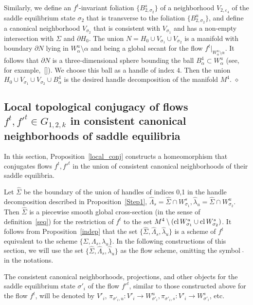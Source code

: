 \documentclass[%
 aip,
 amsmath,amssymb,
preprint,%
]{revtex4-1}
\newenvironment{proof}{{\bf Proof:}}
{\hfill $\diamond$\medskip}
\begin{document}
\begin{proof}
Similarly, we define an $f^t$-invariant foliation $\{B^s_{2,\sigma_2}\}$ of a neighborhood $V_{2,\varepsilon_4}$ of the saddle equilibrium state $\sigma_2$ that is transverse to the foliation $\{B^u_{2,\sigma_2}\}$, and define a canonical neighborhood $V_{\sigma_2}$ that is consistent with $V_{\sigma_1}$ and has a non-empty intersection with $\Sigma$ and $\partial H_0$. The union $N=H_0\cup V_{\sigma_1}\cup V_{\sigma_2}$ is a manifold with boundary $\partial N$ lying in $W^u_\alpha\setminus \alpha$ and being a global secant for the flow $f^t|_{W^u_{\alpha}\setminus \alpha}$. It follows that $\partial N$ is a three-dimensional sphere bounding the ball $B^4_\alpha\subset W^u_\alpha$ (see, for example,~[]). We choose this ball as a handle of index $4$. Then the union $H_0\cup V_{\sigma_1}\cup V_{\sigma_2}\cup B^4_\alpha$ is the desired handle decomposition of the manifold $M^4$.
\end{proof}

\subsection{Local topological conjugacy of flows $f^t, {f'}^t\in G_{1,2,k}$ in consistent canonical neighborhoods of saddle equilibria}

In this section, Proposition~\ref{local_conj} constructs a homeomorphism that conjugates flows $f^t, {f'}^t$ in the union of consistent canonical neighborhoods of their saddle equilibria.

Let $\widehat \Sigma$ be the boundary of the union of handles of indices 0,1 in the handle decomposition described in Proposition~\ref{Step1}, $\widehat \Lambda_s=\widehat \Sigma\cap W^s_{\sigma_1}, \widehat \lambda_u=\widehat \Sigma\cap W^u_{\sigma_2}$. Then $\widehat \Sigma$ is a piecewise smooth global cross-section (in the sense of definition~\ref{seq}) for the restriction of $f^t$ to the set $M^4\setminus ({\rm cl}\, W^u_{\sigma_1}\cup {\rm cl}\, W^s_{\sigma_2})$. It follows from Proposition~\ref{indep} that the set $\{\widehat \Sigma, \widehat \Lambda_s, \widehat \lambda_u\}$ is a scheme of $f^t$ equivalent to the scheme $\{\Sigma, \Lambda_s, \lambda_u\}$. In the following constructions of this section, we will use the set $\{\widehat \Sigma, \widehat \Lambda_s, \widehat \lambda_u\}$ as the flow scheme, omitting the symbol $\ \widehat{}\ $ in the notations.

The consistent canonical neighborhoods, projections, and other objects for the saddle equilibrium state $\sigma'_i$ of the flow ${f'}^t$, similar to those constructed above for the flow $f^t$, will be denoted by $V'_{i}$, $\pi_{\sigma'_i,u}: V'_{i}\to W^u_{\sigma'_i}, \pi_{\sigma'_i,s}: V'_{i}\to W^s_{\sigma'_i}$, etc.
\end{document}
